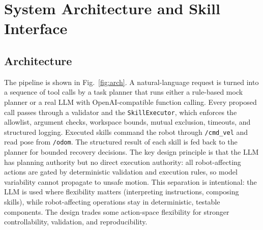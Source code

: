 \documentclass[conference]{IEEEtran}
\begin{document}
\section{System Architecture and Skill Interface}

\subsection{Architecture}
The pipeline is shown in Fig.~\ref{fig:arch}. A natural-language request is
turned into a sequence of tool calls by a task planner that runs either a
rule-based mock planner or a real LLM with OpenAI-compatible function calling.
Every proposed call passes through a validator and the \texttt{SkillExecutor},
which enforces the allowlist, argument checks, workspace bounds, mutual
exclusion, timeouts, and structured logging. Executed skills command the
robot through \texttt{/cmd\_vel} and read pose from \texttt{/odom}. The
structured result of each skill is fed back to the planner for bounded
recovery decisions. The key design principle is that the LLM has planning
authority but no direct execution authority: all robot-affecting actions are
gated by deterministic validation and execution rules, so model variability
cannot propagate to unsafe motion. This separation is intentional: the LLM
is used where flexibility matters (interpreting instructions, composing
skills), while robot-affecting operations stay in deterministic, testable
components. The design trades some action-space flexibility for stronger
controllability, validation, and reproducibility.
\end{document}
